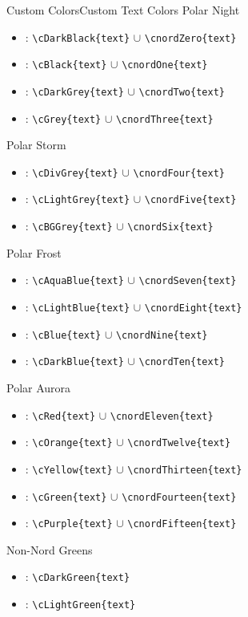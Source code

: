 \documentclass[aspectratio=169, sectionpages]{beamer}
\begin{document}
\begin{frame}{Custom Colors}{Custom Text Colors}
	{\Large{Polar Night}}
	\begin{itemize}
		\item  {}: \verb!\cDarkBlack{text}! \( \cup \) \verb!\cnordZero{text}!
		\item  {}: \verb!\cBlack{text}! \( \cup \) \verb!\cnordOne{text}!
		\item  {}: \verb!\cDarkGrey{text}! \( \cup \) \verb!\cnordTwo{text}!
		\item  {}: \verb!\cGrey{text}! \( \cup \) \verb!\cnordThree{text}!
	\end{itemize}
	{\Large{Polar Storm}}
	\begin{itemize}
		\item  {}: \verb!\cDivGrey{text}! \( \cup \) \verb!\cnordFour{text}!
		\item  {}: \verb!\cLightGrey{text}! \( \cup \) \verb!\cnordFive{text}!
		\item  {}: \verb!\cBGGrey{text}! \( \cup \) \verb!\cnordSix{text}!
	\end{itemize}
	\framebreak
	{\Large{Polar Frost}}
	\begin{itemize}
		\item  {}: \verb!\cAquaBlue{text}! \( \cup \) \verb!\cnordSeven{text}!
		\item  {}: \verb!\cLightBlue{text}! \( \cup \) \verb!\cnordEight{text}!
		\item  {}: \verb!\cBlue{text}! \( \cup \) \verb!\cnordNine{text}!
		\item  {}: \verb!\cDarkBlue{text}! \( \cup \) \verb!\cnordTen{text}!
	\end{itemize}
	{\Large{Polar Aurora}}
	\begin{itemize}
		\item  {}: \verb!\cRed{text}! \( \cup \) \verb!\cnordEleven{text}!
		\item  {}: \verb!\cOrange{text}! \( \cup \) \verb!\cnordTwelve{text}!
		\item  {}: \verb!\cYellow{text}! \( \cup \) \verb!\cnordThirteen{text}!
		\item  {}: \verb!\cGreen{text}! \( \cup \) \verb!\cnordFourteen{text}!
		\item  {}: \verb!\cPurple{text}! \( \cup \) \verb!\cnordFifteen{text}!
	\end{itemize}
	\framebreak
	{\Large{Non-Nord Greens}}
	\begin{itemize}
		\item {}: \verb!\cDarkGreen{text}!
		\item {}: \verb!\cLightGreen{text}!
	\end{itemize}
\end{frame}
\end{document}
